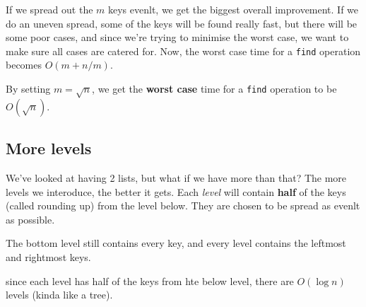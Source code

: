 \documentclass[11pt,a4paper,titlepage,dvipsnames,cmyk]{scrartcl}
\begin{document}
If we spread out the $m$ keys evenlt, we get the biggest overall
improvement. If we do an uneven spread, some of the keys will be found
really fast, but there will be some poor cases, and since we're trying to
minimise the worst case, we want to make sure all cases are catered for.
Now, the worst case time for a \lstinline|find| operation becomes $O(m +
n/m)$.

By setting $m = \sqrt{n}$, we get the \textbf{worst case} time for a
\lstinline|find|  operation to be $O(\sqrt{n})$.

\subsection{More levels}%
\label{sub:levels}
We've looked at having 2 lists, but what if we have more than that? The
more levels we interoduce, the better it gets. Each \textit{level} will
contain \textbf{half} of the keys (called rounding up) from the level
below. They are chosen to be spread as evenlt as possible.

The bottom level still contains every key, and every level contains the
leftmost and rightmost keys.

since each level has half of the keys from hte below level, there are
$O(\log n)$ levels (kinda like a tree). 

\end{document}
